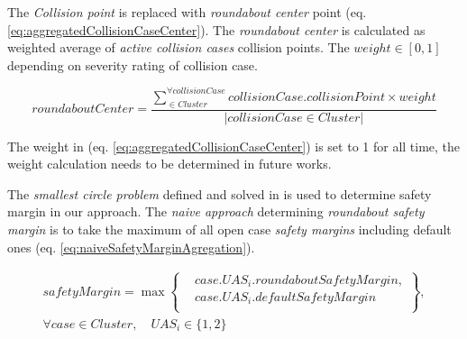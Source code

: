 The \emph{Collision point} is replaced with \emph{roundabout center} point (eq. \ref{eq:aggregatedCollisionCaseCenter}). The \emph{roundabout center} is calculated as weighted average of \emph{active collision cases} collision points. The $weight \in [0,1]$ depending on severity rating of collision case.

\begin{equation}\label{eq:aggregatedCollisionCaseCenter}
    roundaboutCenter=\frac{\sum_{ \in Cluster}^{\forall collisionCase} collisionCase.collisionPoint \times weight}{\left | collisionCase \in Cluster \right |}
\end{equation}

\begin{note}
    The weight in (eq. \ref{eq:aggregatedCollisionCaseCenter}) is set to 1 for all time, the weight calculation needs to be determined in future works. 
\end{note}

The \emph{smallest circle problem} defined and solved in \cite{ritter1990efficient,welzl1991smallest} is used to determine safety margin in our approach. The \emph{naive approach} determining \emph{roundabout safety margin} is to take the maximum of all open case \emph{safety margins} including default ones (eq. \ref{eq:naiveSafetyMarginAgregation}).

\begin{multline}\label{eq:naiveSafetyMarginAgregation}
    safetyMargin = \max \left\{\begin{aligned}&case.UAS_i.roundabout Safety Margin,\\&case.UAS_i.default Safety Margin\\\end{aligned}\right \},\\
    \forall case \in Cluster,\quad UAS_i \in \{1,2\}
\end{multline}

\newpage


